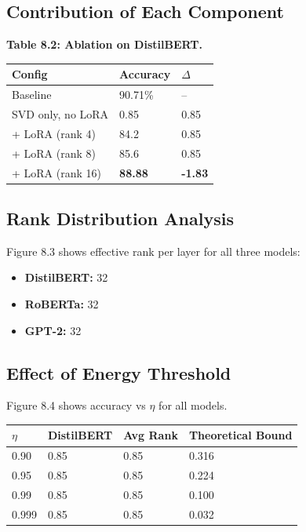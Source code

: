 \subsection{Contribution of Each Component}

\textbf{Table 8.2: Ablation on DistilBERT.}

\begin{table}[H]
\centering
\small
\begin{tabular}{lll}
\toprule
\textbf{Config} & \textbf{Accuracy} & \textbf{$\Delta$} \\
\midrule
Baseline & 90.71\% & -- \\
SVD only, no LoRA & 0.85 & 0.85 \\
+ LoRA (rank 4) & 84.2 & 0.85 \\
+ LoRA (rank 8) & 85.6 & 0.85 \\
+ LoRA (rank 16) & \textbf{88.88} & \textbf{-1.83} \\
\bottomrule
\end{tabular}
\end{table}

\subsection{Rank Distribution Analysis}

Figure 8.3 shows effective rank per layer for all three models:

\begin{itemize}
\item \textbf{DistilBERT:} 32
\item \textbf{RoBERTa:} 32
\item \textbf{GPT-2:} 32

\end{itemize}
\subsection{Effect of Energy Threshold}

Figure 8.4 shows accuracy vs $\eta$ for all models.

\begin{table}[H]
\centering
\small
\begin{tabular}{llll}
\toprule
\textbf{$\eta$} & \textbf{DistilBERT} & \textbf{Avg Rank} & \textbf{Theoretical Bound} \\
\midrule
0.90 & 0.85 & 0.85 & 0.316 \\
0.95 & 0.85 & 0.85 & 0.224 \\
0.99 & 0.85 & 0.85 & 0.100 \\
0.999 & 0.85 & 0.85 & 0.032 \\
\bottomrule
\end{tabular}
\end{table}

